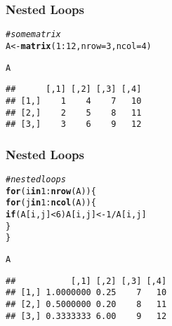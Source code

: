 \documentclass[12pt]{beamer}\usepackage[]{graphicx}\usepackage[]{color}
\makeatletter
\newcommand{\hlnum}[1]{\textcolor[rgb]{0.686,0.059,0.569}{#1}}%
\newcommand{\hlcom}[1]{\textcolor[rgb]{0.678,0.584,0.686}{\textit{#1}}}%
\newcommand{\hlopt}[1]{\textcolor[rgb]{0,0,0}{#1}}%
\newcommand{\hlstd}[1]{\textcolor[rgb]{0.345,0.345,0.345}{#1}}%
\newcommand{\hlkwa}[1]{\textcolor[rgb]{0.161,0.373,0.58}{\textbf{#1}}}%
\newcommand{\hlkwb}[1]{\textcolor[rgb]{0.69,0.353,0.396}{#1}}%
\newcommand{\hlkwc}[1]{\textcolor[rgb]{0.333,0.667,0.333}{#1}}%
\newcommand{\hlkwd}[1]{\textcolor[rgb]{0.737,0.353,0.396}{\textbf{#1}}}%
\newenvironment{kframe}{%
 \def\at@end@of@kframe{}%
 \ifinner\ifhmode%
  \def\at@end@of@kframe{\end{minipage}}%
  \begin{minipage}{\columnwidth}%
 \fi\fi%
 \def\FrameCommand##1{\hskip\@totalleftmargin \hskip-\fboxsep
 \colorbox{shadecolor}{##1}\hskip-\fboxsep
     \hskip-\linewidth \hskip-\@totalleftmargin \hskip\columnwidth}%
 \MakeFramed {\advance\hsize-\width
   \@totalleftmargin\z@ \linewidth\hsize
   \@setminipage}}%
 {\par\unskip\endMakeFramed%
 \at@end@of@kframe}
\newenvironment{knitrout}{}{} %
\makeatother
\begin{document}

\begin{frame}[fragile]
\frametitle{Nested Loops}

\begin{knitrout}\footnotesize
{}\color{fgcolor}\begin{kframe}
\begin{alltt}
\hlcom{# some matrix }
\hlstd{A} \hlkwb{<-} \hlkwd{matrix}\hlstd{(}\hlnum{1}\hlopt{:}\hlnum{12}\hlstd{,} \hlkwc{nrow} \hlstd{=} \hlnum{3}\hlstd{,} \hlkwc{ncol} \hlstd{=} \hlnum{4}\hlstd{)}

\hlstd{A}
\end{alltt}
\begin{verbatim}
##      [,1] [,2] [,3] [,4]
## [1,]    1    4    7   10
## [2,]    2    5    8   11
## [3,]    3    6    9   12
\end{verbatim}
\end{kframe}
\end{knitrout}

\end{frame}


\begin{frame}[fragile]
\frametitle{Nested Loops}
\begin{knitrout}\footnotesize
{}\color{fgcolor}\begin{kframe}
\begin{alltt}
\hlcom{# nested loops}
\hlkwa{for} \hlstd{(i} \hlkwa{in} \hlnum{1}\hlopt{:}\hlkwd{nrow}\hlstd{(A)) \{}
  \hlkwa{for} \hlstd{(j} \hlkwa{in} \hlnum{1}\hlopt{:}\hlkwd{ncol}\hlstd{(A)) \{}
    \hlkwa{if} \hlstd{(A[i,j]} \hlopt{<} \hlnum{6}\hlstd{) A[i,j]} \hlkwb{<-} \hlnum{1} \hlopt{/} \hlstd{A[i,j]}
  \hlstd{\}}
\hlstd{\}}

\hlstd{A}
\end{alltt}
\begin{verbatim}
##           [,1] [,2] [,3] [,4]
## [1,] 1.0000000 0.25    7   10
## [2,] 0.5000000 0.20    8   11
## [3,] 0.3333333 6.00    9   12
\end{verbatim}
\end{kframe}
\end{knitrout}

\end{frame}

\end{document}

